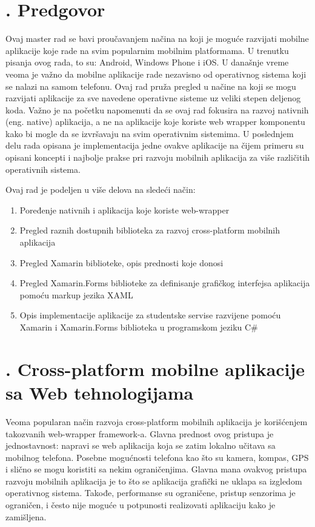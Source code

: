\documentclass[a4paper]{article}
\newcommand\liststyleLi{%
\renewcommand\theenumi{\arabic{enumi}}
\renewcommand\theenumii{\arabic{enumii}}
\renewcommand\theenumiii{\arabic{enumiii}}
\renewcommand\theenumiv{\arabic{enumiv}}
\renewcommand\labelenumi{\theenumi.}
\renewcommand\labelenumii{\theenumii.}
\renewcommand\labelenumiii{\theenumiii.}
\renewcommand\labelenumiv{\theenumiv.}
}
\begin{document}
\bigskip

\clearpage\section[1. Predgovor]{. Predgovor}
\hypertarget{RefHeadingToc108271175048}{}Ovaj master rad se bavi
proučavanjem načina na koji je moguće razvijati mobilne aplikacije koje
rade na svim popularnim mobilnim platformama. U trenutku pisanja ovog
rada, to su: Android, Windows Phone i iOS. U današnje vreme veoma je
važno da mobilne aplikacije rade nezavisno od operativnog sistema koji
se nalazi na samom telefonu. Ovaj rad pruža pregled u načine na koji se
mogu razvijati aplikacije za sve navedene operativne sisteme uz veliki
stepen deljenog koda. Važno je na početku napomenuti da se ovaj rad
fokusira na razvoj nativnih (eng. native) aplikacija, a ne na
aplikacije koje koriste web wrapper komponentu kako bi mogle da se
izvršavaju na svim operativnim sistemima. U poslednjem delu rada
opisana je implementacija jedne ovakve aplikacije na čijem primeru su
opisani koncepti i najbolje prakse pri razvoju mobilnih aplikacija za
više različitih operativnih sistema.

Ovaj rad je podeljen u više delova na sledeći način:

\liststyleLi
\begin{enumerate}
\item Poređenje nativnih i aplikacija koje koriste web-wrapper 
\item Pregled raznih dostupnih biblioteka za razvoj cross-platform
mobilnih aplikacija
\item Pregled Xamarin biblioteke, opis prednosti koje donosi 
\item Pregled Xamarin.Forms biblioteke za definisanje grafičkog
interfejsa aplikacija pomoću markup jezika XAML
\item Opis implementacije aplikacije za studentske servise razvijene
pomoću Xamarin i Xamarin.Forms biblioteka u programskom jeziku C\# 
\end{enumerate}

\bigskip

\clearpage\section[2. Cross{}-platform mobilne aplikacije sa Web
tehnologijama]{. Cross-platform mobilne aplikacije sa Web
tehnologijama}
\hypertarget{RefHeadingToc1131308303690}{}Veoma popularan način razvoja
cross-platform mobilnih aplikacija je korišćenjem takozvanih
web-wrapper framework-a. Glavna prednost ovog pristupa je
jednostavnost: napravi se web aplikacija koja se zatim lokalno učitava
sa mobilnog telefona. Posebne mogućnosti telefona kao što su kamera,
kompas, GPS i slično se mogu koristiti sa nekim ograničenjima. Glavna
mana ovakvog pristupa razvoju mobilnih aplikacija je to što se
aplikacija grafički ne uklapa sa izgledom operativnog sistema. Takođe,
performanse su ograničene, pristup senzorima je ograničen, i često nije
moguće u potpunosti realizovati aplikaciju kako je zamišljena.
\end{document}

